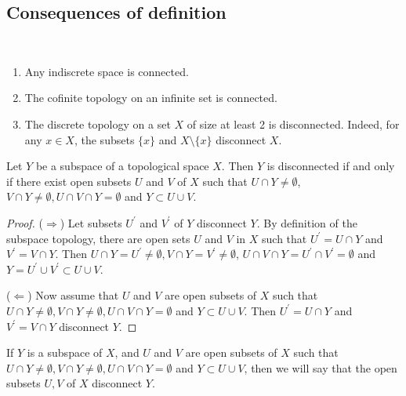\documentclass[a4paper,11pt]{article}
\begin{document}
\subsection{Consequences of definition}\ \vspace{-1.5em}

\begin{example}
    \begin{enumerate}
        \item Any indiscrete space is connected.
      
        \item The cofinite topology on an infinite set is connected.
      
        \item The discrete topology on a set $X$ of size at least 2 is disconnected. Indeed, for any $x \in X$, the subsets $\{x\}$ and $X \setminus\{x\}$ disconnect $X$.
      
      \end{enumerate}
\end{example}

\begin{lemma}
    Let $Y$ be a subspace of a topological space $X$. Then $Y$ is disconnected if and only if there exist open subsets $U$ and $V$ of $X$ such that $U \cap Y \neq \emptyset$, $V \cap Y \neq \emptyset, U \cap V \cap Y=\emptyset$ and $Y \subset U \cup V$.
\end{lemma}
\begin{proof}
    ($ \Rightarrow $) Let subsets $U^{\prime}$ and $V^{\prime}$ of $Y$ disconnect $Y$. By definition of the subspace topology, there are open sets $U$ and $V$ in $X$ such that $U^{\prime}=U \cap Y$ and $V^{\prime}=V \cap Y$. Then $U \cap Y=U^{\prime} \neq \emptyset, V \cap Y=V^{\prime} \neq \emptyset$, $U \cap V \cap Y=U^{\prime} \cap V^{\prime}=\emptyset$ and $Y=U^{\prime} \cup V^{\prime} \subset U \cup V$.

    ($ \Leftarrow $) Now assume that $U$ and $V$ are open subsets of $X$ such that $U \cap Y \neq \emptyset, V \cap Y \neq \emptyset, U \cap V \cap Y=\emptyset$ and $Y \subset U \cup V$. Then $U^{\prime}=U \cap Y$ and $V^{\prime}=V \cap Y$ disconnect $Y$.
\end{proof}

\begin{note}
    If $Y$ is a subspace of $X$, and $U$ and $V$ are open subsets of $X$ such that $U \cap Y \neq \emptyset, V \cap Y \neq \emptyset, U \cap V \cap Y=\emptyset$ and $Y \subset U \cup V$, then we will say that the open subsets $U, V$ of $X$ disconnect $Y$.
\end{note}
\end{document}
